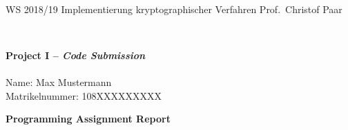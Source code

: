 \documentclass[11pt, a4paper, onecolumn, oneside]{scrartcl}
\begin{document}
{~}

\vspace{-2cm} \noindent WS 2018/19 \hfill
Implementierung kryptographischer Verfahren
\hfill Prof.\ Christof Paar

{~}

\begin{center}
        {\huge \textbf{Project I -- \emph{Code Submission}}}\\
        {~}\\
        {\large Name: Max Mustermann} \\  %
				{\large Matrikelnummer: 108XXXXXXXXX} %
\end{center}

{\large \textbf{Programming Assignment Report}}
\end{document}
